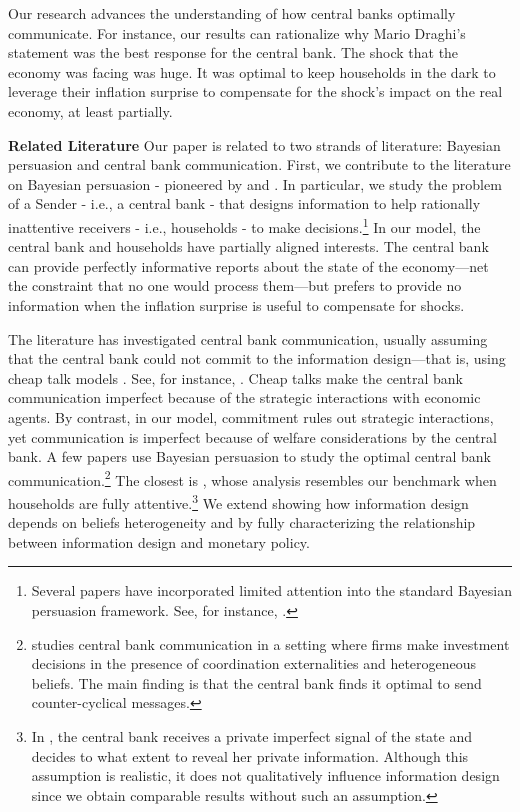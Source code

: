 \documentclass[12pt,a4paper]{article}
\begin{document}
Our research advances the understanding of how central banks optimally communicate. For instance, our results can rationalize why Mario Draghi's statement was the best response for the central bank. The shock that the economy was facing was huge. It was optimal to keep households in the dark to leverage their inflation surprise to compensate for the shock's impact on the real economy, at least partially. 


\noindent\textbf{Related Literature} Our paper is related to two strands of literature: Bayesian persuasion and central bank communication. First, we contribute to the literature on Bayesian persuasion - pioneered by \cite{aumann1995repeated} and \cite{KG2011}. In particular, we study the problem of a Sender - i.e., a central bank - that designs information to help rationally inattentive \citep{Sims2003} receivers - i.e., households - to make decisions.\footnote{Several papers have incorporated limited attention into the standard Bayesian persuasion framework. See, for instance, \cite{Bloedel2020,Lipnowski2020,lipnowski2022,Wei2021,Matyskova2021,innocenti2022can}.} In our model, the central bank and households have partially aligned interests. The central bank can provide perfectly informative reports about the state of the economy---net the constraint that no one would process them---but prefers to provide no information when the inflation surprise is useful to compensate for shocks. 

The literature has investigated central bank communication, usually assuming that the central bank could not commit to the information design---that is, using cheap talk models \citep{crawford1982strategic}. See, for instance, \cite{stein1989cheap, moscarini2007competence, bassetto2019forward}. Cheap talks make the central bank communication imperfect because of the strategic interactions with economic agents. By contrast, in our model, commitment rules out strategic interactions, yet communication is imperfect because of welfare considerations by the central bank.
A few papers use Bayesian persuasion to study the optimal central bank communication.\footnote{\cite{Herbert2021} studies central bank communication in a setting where firms make investment decisions in the presence of coordination externalities and heterogeneous beliefs. The main finding is that the central bank finds it optimal to send counter-cyclical messages.} The closest is \cite{Ko2022}, whose analysis resembles our benchmark when households are fully attentive.\footnote{In \cite{Ko2022}, the central bank receives a private imperfect signal of the state and decides to what extent to reveal her private information. Although this assumption is realistic, it does not qualitatively influence information design since we obtain comparable results without such an assumption.} We extend \cite{Ko2022} showing how information design depends on beliefs heterogeneity and by fully characterizing the relationship between information design and monetary policy.
\end{document}
